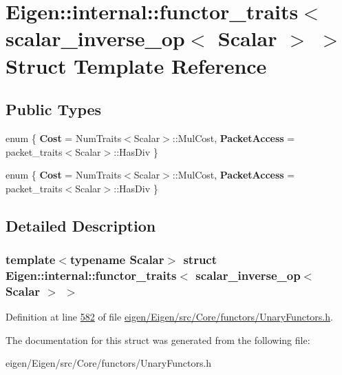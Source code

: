 \hypertarget{struct_eigen_1_1internal_1_1functor__traits_3_01scalar__inverse__op_3_01_scalar_01_4_01_4}{}\section{Eigen\+:\+:internal\+:\+:functor\+\_\+traits$<$ scalar\+\_\+inverse\+\_\+op$<$ Scalar $>$ $>$ Struct Template Reference}
\label{struct_eigen_1_1internal_1_1functor__traits_3_01scalar__inverse__op_3_01_scalar_01_4_01_4}
\subsection*{Public Types}
\begin{DoxyCompactItemize}
\item 
\mbox{\label{struct_eigen_1_1internal_1_1functor__traits_3_01scalar__inverse__op_3_01_scalar_01_4_01_4_a8241a327855160e2a5a1edc95b99dec4}} 
enum \{ {\bfseries Cost} = Num\+Traits$<$Scalar$>$\+:\+:Mul\+Cost, 
{\bfseries Packet\+Access} = packet\+\_\+traits$<$Scalar$>$\+:\+:Has\+Div
 \}
\item 
\mbox{\label{struct_eigen_1_1internal_1_1functor__traits_3_01scalar__inverse__op_3_01_scalar_01_4_01_4_ae8377e0db154478605787215ed4fedb9}} 
enum \{ {\bfseries Cost} = Num\+Traits$<$Scalar$>$\+:\+:Mul\+Cost, 
{\bfseries Packet\+Access} = packet\+\_\+traits$<$Scalar$>$\+:\+:Has\+Div
 \}
\end{DoxyCompactItemize}


\subsection{Detailed Description}
\subsubsection*{template$<$typename Scalar$>$\newline
struct Eigen\+::internal\+::functor\+\_\+traits$<$ scalar\+\_\+inverse\+\_\+op$<$ Scalar $>$ $>$}



Definition at line \hyperlink{eigen_2_eigen_2src_2_core_2functors_2_unary_functors_8h_source_l00582}{582} of file \hyperlink{eigen_2_eigen_2src_2_core_2functors_2_unary_functors_8h_source}{eigen/\+Eigen/src/\+Core/functors/\+Unary\+Functors.\+h}.



The documentation for this struct was generated from the following file\+:\begin{DoxyCompactItemize}
\item 
eigen/\+Eigen/src/\+Core/functors/\+Unary\+Functors.\+h\end{DoxyCompactItemize}

